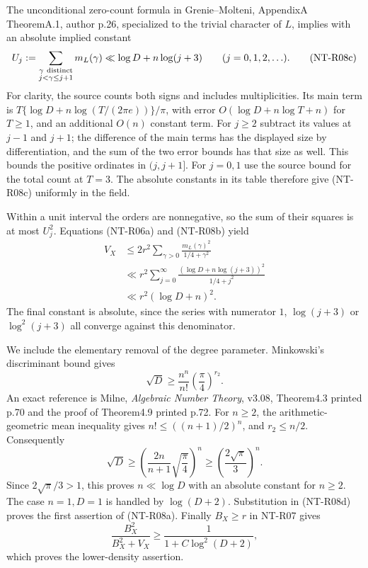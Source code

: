 The unconditional zero-count formula in Grenie--Molteni,
AppendixA TheoremA.1, author p.26, specialized to the trivial
character of $L$, implies with an absolute implied constant
\[
 U_j:=\sum_{\substack{\gamma\ {\rm distinct}\\j<\gamma\le j+1}}
                  m_L(\gamma)
       \ll \log D+n\log(j+3)\qquad(j=0,1,2,\ldots).
 \tag{NT-R08c}
\]
For clarity, the source counts both signs and includes
multiplicities. Its main term is
$T\{\log D+n\log(T/(2\pi e))\}/\pi$, with error
$O(\log D+n\log T+n)$ for $T\ge1$, and an additional
$O(n)$ constant term. For $j\ge2$ subtract its values at
$j-1$ and $j+1$; the difference of the main terms has the
displayed size by differentiation, and the sum of the two
error bounds has that size as well. This bounds the positive
ordinates in $(j,j+1]$. For $j=0,1$ use the source bound for
the total count at $T=3$. The absolute constants in its table
therefore give (NT-R08c) uniformly in the field.

Within a unit interval the orders are nonnegative, so the sum
of their squares is at most $U_j^2$. Equations (NT-R06a) and
(NT-R08b) yield
\[
 \begin{split}
 V_X
 &\le 2r^2\sum_{\gamma>0}
                  \frac{m_L(\gamma)^2}{1/4+\gamma^2}\\
 &\ll r^2\sum_{j=0}^{\infty}
          \frac{(\log D+n\log(j+3))^2}{1/4+j^2}\\
 &\ll r^2(\log D+n)^2.
 \end{split}
 \tag{NT-R08d}
\]
The final constant is absolute, since the series with numerator
$1$, $\log(j+3)$ or $\log^2(j+3)$ all converge against this
denominator.

We include the elementary removal of the degree parameter.
Minkowski's discriminant bound gives
\[
 \sqrt D\ge\frac{n^n}{n!}\left(\frac{\pi}{4}\right)^{r_2}.
\]
An exact reference is Milne, \emph{Algebraic Number Theory},
v3.08, Theorem4.3 printed p.70 and the proof of Theorem4.9
printed p.72. For $n\ge2$, the arithmetic-geometric mean
inequality gives $n!\le((n+1)/2)^n$, and $r_2\le n/2$.
Consequently
\[
 \sqrt D\ge
 \left(\frac{2n}{n+1}\sqrt{\frac{\pi}{4}}\right)^n
 \ge\left(\frac{2\sqrt\pi}{3}\right)^n.
\]
Since $2\sqrt\pi/3>1$, this proves
$n\ll\log D$ with an absolute constant for $n\ge2$.
The case $n=1,D=1$ is handled by $\log(D+2)$.
Substitution in (NT-R08d) proves the first assertion of
(NT-R08a). Finally $B_X\ge r$ in NT-R07 gives
\[
 \frac{B_X^2}{B_X^2+V_X}
 \ge \frac1{1+C\log^2(D+2)},
\]
which proves the lower-density assertion.

